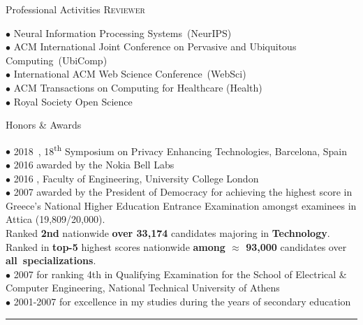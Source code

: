 \documentclass[11pt]{resume}
\begin{document}
\begin{category}{Professional Activities}
\citemnobullet
\textsc{Reviewer}

$\bullet$ Neural Information Processing Systems~(NeurIPS)\\
$\bullet$ ACM International Joint Conference on Pervasive and Ubiquitous \mbox{Computing~(UbiComp)}\\
$\bullet$ International ACM Web Science Conference~(WebSci)\\
$\bullet$ ACM Transactions on Computing for Healthcare (Health)\\
$\bullet$  Royal Society Open Science

\end{category}


\newcommand{\ts}{\textsuperscript}


\vspace{1cm}
\begin{category}{Honors \& Awards}

$\bullet$ 2018~, 18\ts{th} Symposium on Privacy Enhancing Technologies, Barcelona, Spain \\

$\bullet$ 2016  awarded by the Nokia Bell Labs  \\

$\bullet$ 2016 , Faculty of Engineering, University College London \\

$\bullet$ 2007  awarded by the President of Democracy for achieving the highest score in Greece's National
Higher Education Entrance Examination amongst examinees in Attica (19,809/20,000).\\ 
Ranked \textbf{2nd} nationwide \textbf{over 33,174} candidates majoring in \textbf{Technology}.\\ 
Ranked in \textbf{top-5} highest scores nationwide \textbf{among $\approx$ 93,000} candidates over \mbox{\textbf{all specializations}}.\\

$\bullet$ 2007  for ranking 4th in Qualifying Examination
for the School of Electrical \& Computer Engineering, National Technical University of Athens \\

$\bullet$ 2001-2007  for excellence in my studies during the years of secondary education \\

\noindent\rule{\textwidth}{0.2pt}
\end{category}
\end{document}
